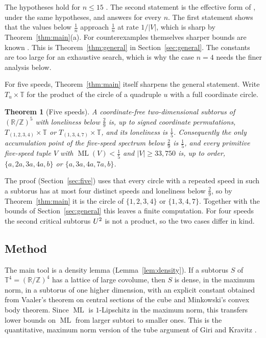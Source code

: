 \documentclass[12pt]{amsart}
\newtheorem{theorem}{Theorem}[section]
\theoremstyle{definition}\newtheorem{definition}[theorem]{Definition}
\theoremstyle{remark}\newtheorem{remark}[theorem]{Remark}
\newcommand{\Z}{\mathbb Z}\newcommand{\R}{\mathbb R}\newcommand{\T}{\mathbb T}
\newcommand{\ML}{\operatorname{ML}}
\newcommand{\eucl}[1]{\lvert #1\rvert}
\begin{document}
The hypotheses hold for $n\le15$ \cite{BarajasSerra,Rosenfeld,Trak,SungTrak,Allikvere}. The second statement is the effective form of \cite[Lemma~2.4]{Cordella}, under the same hypotheses, and answers \cite[Question~6.7]{Cordella} for every $n$. The first statement shows that the values below $\frac1n$ approach $\frac1n$ at rate $1/\eucl V$, which is sharp by Theorem~\ref{thm:main}(a). For counterexamples themselves sharper bounds are known \cite{MSS,Allikvere}. This is Theorem~\ref{thm:general} in Section~\ref{sec:general}. The constants are too large for an exhaustive search, which is why the case $n=4$ needs the finer analysis below.

For five speeds, Theorem~\ref{thm:main} itself sharpens the general statement. Write $T_u\times\T$ for the product of the circle of a quadruple $u$ with a full coordinate circle.

\begin{theorem}[Five speeds]\label{thm:five-intro}
A coordinate-free two-dimensional subtorus of $(\R/\Z)^5$ with loneliness below $\frac29$ is, up to signed coordinate permutations, $T_{(1,2,3,4)}\times\T$ or $T_{(1,3,4,7)}\times\T$, and its loneliness is $\frac15$. Consequently the only accumulation point of the five-speed spectrum below $\frac29$ is $\frac15$, and every primitive five-speed tuple $V$ with $\ML(V)<\frac15$ and $\eucl V\ge33{,}750$ is, up to order, $\{a,2a,3a,4a,b\}$ or $\{a,3a,4a,7a,b\}$.
\end{theorem}

The proof (Section~\ref{sec:five}) uses that every circle with a repeated speed in such a subtorus has at most four distinct speeds and loneliness below $\frac29$, so by Theorem~\ref{thm:main} it is the circle of $\{1,2,3,4\}$ or $\{1,3,4,7\}$. Together with the bounds of Section~\ref{sec:general} this leaves a finite computation. For four speeds the second critical subtorus $U^{2}$ is not a product, so the two cases differ in kind.

\subsection*{Method}
The main tool is a density lemma (Lemma~\ref{lem:density}). If a subtorus $S$ of $\T^4=(\R/\Z)^4$ has a lattice of large covolume, then $S$ is dense, in the maximum norm, in a subtorus of one higher dimension, with an explicit constant obtained from Vaaler's theorem on central sections of the cube \cite{Vaaler} and Minkowski's convex body theorem. Since $\ML$ is $1$-Lipschitz in the maximum norm, this transfers lower bounds on $\ML$ from larger subtori to smaller ones. This is the quantitative, maximum norm version of the tube argument of Giri and Kravitz \cite[Lemma~4.4]{GiriKravitz}.
\end{document}
